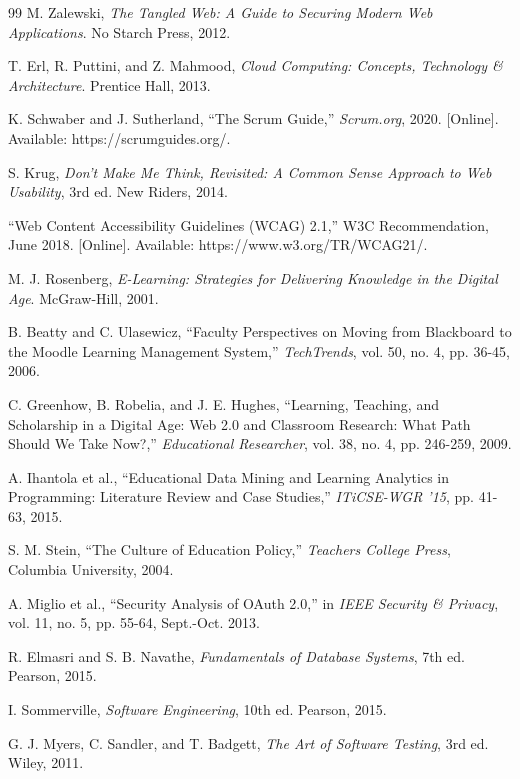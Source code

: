 \begin{thebibliography}{99}
M. Zalewski, \textit{The Tangled Web: A Guide to Securing Modern Web Applications}. No Starch Press, 2012.

T. Erl, R. Puttini, and Z. Mahmood, \textit{Cloud Computing: Concepts, Technology \& Architecture}. Prentice Hall, 2013.

K. Schwaber and J. Sutherland, ``The Scrum Guide,'' \textit{Scrum.org}, 2020. [Online]. Available: https://scrumguides.org/.

S. Krug, \textit{Don't Make Me Think, Revisited: A Common Sense Approach to Web Usability}, 3rd ed. New Riders, 2014.

``Web Content Accessibility Guidelines (WCAG) 2.1,'' W3C Recommendation, June 2018. [Online]. Available: https://www.w3.org/TR/WCAG21/.

M. J. Rosenberg, \textit{E-Learning: Strategies for Delivering Knowledge in the Digital Age}. McGraw-Hill, 2001.

B. Beatty and C. Ulasewicz, ``Faculty Perspectives on Moving from Blackboard to the Moodle Learning Management System,'' \textit{TechTrends}, vol. 50, no. 4, pp. 36-45, 2006.

C. Greenhow, B. Robelia, and J. E. Hughes, ``Learning, Teaching, and Scholarship in a Digital Age: Web 2.0 and Classroom Research: What Path Should We Take Now?,'' \textit{Educational Researcher}, vol. 38, no. 4, pp. 246-259, 2009.

A. Ihantola et al., ``Educational Data Mining and Learning Analytics in Programming: Literature Review and Case Studies,'' \textit{ITiCSE-WGR '15}, pp. 41-63, 2015.

S. M. Stein, ``The Culture of Education Policy,'' \textit{Teachers College Press}, Columbia University, 2004.

A. Miglio et al., ``Security Analysis of OAuth 2.0,'' in \textit{IEEE Security \& Privacy}, vol. 11, no. 5, pp. 55-64, Sept.-Oct. 2013.

R. Elmasri and S. B. Navathe, \textit{Fundamentals of Database Systems}, 7th ed. Pearson, 2015.

I. Sommerville, \textit{Software Engineering}, 10th ed. Pearson, 2015.

G. J. Myers, C. Sandler, and T. Badgett, \textit{The Art of Software Testing}, 3rd ed. Wiley, 2011.


\end{thebibliography}

